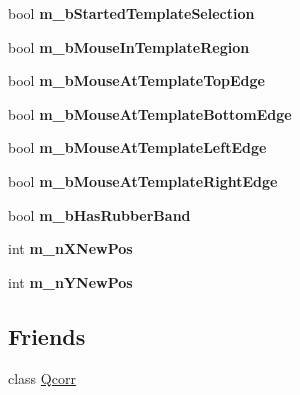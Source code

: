 \begin{CompactItemize}
\item 
\hypertarget{classImgLabel_45fe85b4d6b6da14b556c13284624145}{
bool \textbf{m\_\-bStartedTemplateSelection}}
\label{classImgLabel_45fe85b4d6b6da14b556c13284624145}

\item 
\hypertarget{classImgLabel_990abf371f11243a65aa323bfad1cf10}{
bool \textbf{m\_\-bMouseInTemplateRegion}}
\label{classImgLabel_990abf371f11243a65aa323bfad1cf10}

\item 
\hypertarget{classImgLabel_d4858784cd8aa7a53f948bb42ae7b996}{
bool \textbf{m\_\-bMouseAtTemplateTopEdge}}
\label{classImgLabel_d4858784cd8aa7a53f948bb42ae7b996}

\item 
\hypertarget{classImgLabel_6d005e4bb487858c70d4d14564e4a095}{
bool \textbf{m\_\-bMouseAtTemplateBottomEdge}}
\label{classImgLabel_6d005e4bb487858c70d4d14564e4a095}

\item 
\hypertarget{classImgLabel_921c1163775a86236d44d84e11172177}{
bool \textbf{m\_\-bMouseAtTemplateLeftEdge}}
\label{classImgLabel_921c1163775a86236d44d84e11172177}

\item 
\hypertarget{classImgLabel_fa3d9dc393d218e31b71f3e34bc79f9c}{
bool \textbf{m\_\-bMouseAtTemplateRightEdge}}
\label{classImgLabel_fa3d9dc393d218e31b71f3e34bc79f9c}

\item 
\hypertarget{classImgLabel_e9d9356f7e968bd4416d2b875efcf535}{
bool \textbf{m\_\-bHasRubberBand}}
\label{classImgLabel_e9d9356f7e968bd4416d2b875efcf535}

\item 
\hypertarget{classImgLabel_8440c20742b16b7b2bdceebe3e9f3302}{
int \textbf{m\_\-nXNewPos}}
\label{classImgLabel_8440c20742b16b7b2bdceebe3e9f3302}

\item 
\hypertarget{classImgLabel_2060dad81295d4e6f87328108f97d15f}{
int \textbf{m\_\-nYNewPos}}
\label{classImgLabel_2060dad81295d4e6f87328108f97d15f}

\end{CompactItemize}
\subsection*{Friends}
\begin{CompactItemize}
\item 
\hypertarget{classImgLabel_e86bc9b92f374c5f78097881af49364d}{
class \hyperlink{classImgLabel_e86bc9b92f374c5f78097881af49364d}{Qcorr}}
\label{classImgLabel_e86bc9b92f374c5f78097881af49364d}

\end{CompactItemize}


